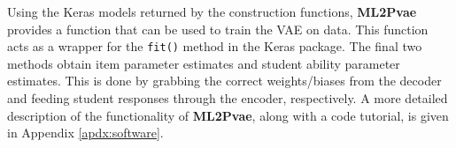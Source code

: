 Using the Keras models returned by the construction functions, \textbf{ML2Pvae} provides a function that can be used to train the VAE on data. This function acts as a wrapper for the \verb!fit()! method in the Keras package. The final two methods obtain item parameter estimates and student ability parameter estimates. This is done by grabbing the correct weights/biases from the decoder and feeding student responses through the encoder, respectively. A more detailed description of the functionality of \textbf{ML2Pvae}, along with a code tutorial, is given in Appendix \ref{apdx:software}.

